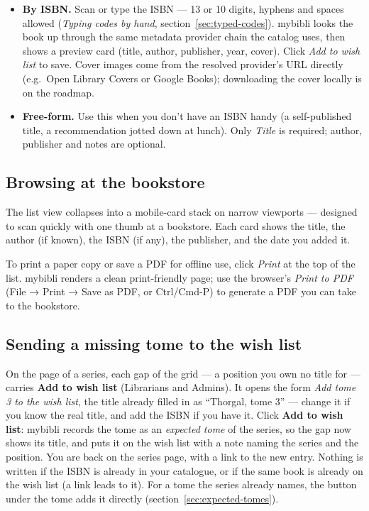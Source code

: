 \begin{itemize}
  \item \textbf{By ISBN.} Scan or type the ISBN --- 13 or 10 digits,
        hyphens and spaces allowed (\emph{Typing codes by hand},
        section~\ref{sec:typed-codes}). mybibli
        looks the book up through the same metadata provider chain
        the catalog uses, then shows a preview card (title, author,
        publisher, year, cover). Click \emph{Add to wish list} to
        save. Cover images come from the resolved provider's URL
        directly (e.g.\ Open Library Covers or Google Books);
        downloading the cover locally is on the roadmap.
  \item \textbf{Free-form.} Use this when you don't have an ISBN
        handy (a self-published title, a recommendation jotted
        down at lunch). Only \emph{Title} is required; author,
        publisher and notes are optional.
\end{itemize}

\subsection{Browsing at the bookstore}

The list view collapses into a mobile-card stack on narrow
viewports — designed to scan quickly with one thumb at a
bookstore. Each card shows the title, the author (if known), the
ISBN (if any), the publisher, and the date you added it.

To print a paper copy or save a PDF for offline use, click
\emph{Print} at the top of the list. mybibli renders a clean
print-friendly page; use the browser's \emph{Print to PDF}
(File \string→ Print \string→ Save as PDF, or Ctrl/Cmd-P) to
generate a PDF you can take to the bookstore.

\subsection{Sending a missing tome to the wish list}
\label{sec:wishlist-gap}

On the page of a series, each gap of the grid --- a position you own
no title for --- carries \textbf{Add to wish list} (Librarians and
Admins). It opens the form \emph{Add tome 3 to the wish list}, the
title already filled in as ``Thorgal, tome 3'' --- change it if you
know the real title, and add the ISBN if you have it. Click
\textbf{Add to wish list}: mybibli records the tome as an
\emph{expected tome} of the series, so the gap now shows its title, and
puts it on the wish list with a note naming the series and the
position. You are back on the series page, with a link to the new
entry. Nothing is written if the ISBN is already in your catalogue, or
if the same book is already on the wish list (a link leads to it).
For a tome the series already names, the button under the tome adds it
directly (section~\ref{sec:expected-tomes}).


